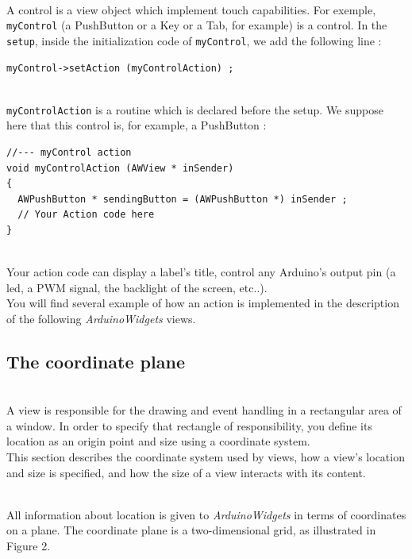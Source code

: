 \documentclass[a4paper,11pt]{extarticle}
\begin{document}
~\\ A control is a view object which implement touch capabilities. For exemple, \texttt{myControl} (a PushButton or a Key or a Tab, for example) is a control. In the \texttt{setup}, inside the initialization code of \texttt{myControl}, we add the following line :

\begin{lstlisting}[language=Arduinonl]
myControl->setAction (myControlAction) ;
\end{lstlisting}

~\\ \texttt{myControlAction} is a routine which is declared before the setup. We suppose here that this control is, for example, a PushButton :

\begin{lstlisting}[language=Arduinonl]
//--- myControl action
void myControlAction (AWView * inSender)
{
  AWPushButton * sendingButton = (AWPushButton *) inSender ;
  // Your Action code here
}
\end{lstlisting}

~\\ Your action code can display  a label's title, control any Arduino's output pin (a led, a PWM signal, the backlight of the screen, etc..).
~\\ You will find several example of how an action is implemented in the description of the following \emph{ArduinoWidgets} views.

\newpage
\subsection{The coordinate plane}

~\\ A view is responsible for the drawing and event handling in a rectangular area of a window. In order to specify that rectangle of responsibility, you define its location as an origin point and size using a coordinate system.
~\\This section describes the coordinate system used by views, how a view's location and size is specified, and how the size of a view interacts with its content.

~\\ All information about location is given to \emph{ArduinoWidgets} in terms of coordinates on a plane. The coordinate plane is a two-dimensional grid, as illustrated in Figure 2.
\end{document}
